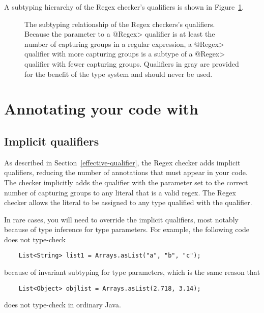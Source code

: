 A subtyping hierarchy of the Regex checker's qualifiers is shown in
Figure~\ref{fig:regex-hierarchy}.

\begin{figure}
\caption{The subtyping relationship of the Regex checkers's qualifiers.
  Because the parameter to a \<@Regex> qualifier is at least the number of
  capturing groups in a regular expression, a \<@Regex> qualifier with more
  capturing groups is a subtype of a \<@Regex> qualifier with fewer capturing
  groups. Qualifiers in gray are provided for the benefit of the type
  system and should never be used.}
\label{fig:regex-hierarchy}
\end{figure}

\section{Annotating your code with \label{annotating-with-regex}}


\subsection{Implicit qualifiers\label{regex-implicit-qualifiers}}

As described in Section~\ref{effective-qualifier}, the Regex checker adds
implicit qualifiers, reducing the number of annotations that must appear
in your code. The checker implicitly adds the  qualifier with
the parameter set to the correct number of capturing groups to
any  literal that is a valid regex. The Regex checker allows
the  literal to be assigned to any type qualified with the
 qualifier.

In rare cases, you will need to override the implicit qualifiers, most
notably because of type inference for type parameters.  For
example, the following code does not type-check

\begin{Verbatim}
    List<String> list1 = Arrays.asList("a", "b", "c");
\end{Verbatim}

\noindent
because of invariant subtyping for type parameters, which is the same reason that

\begin{Verbatim}
    List<Object> objlist = Arrays.asList(2.718, 3.14);
\end{Verbatim}

\noindent
does not type-check in ordinary Java.

